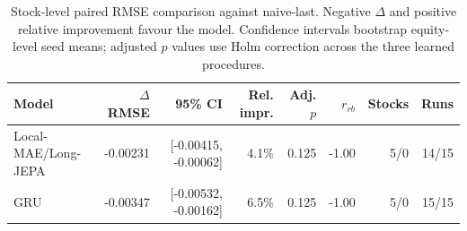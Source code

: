 \begin{table}[t]
\centering
\small
\caption{Stock-level paired RMSE comparison against naive-last. Negative $\Delta$ and positive relative improvement favour the model. Confidence intervals bootstrap equity-level seed means; adjusted $p$ values use Holm correction across the three learned procedures.}
\label{tab:paired_rmse_naive}
\begin{tabular}{lrrrrrrr}
\toprule
Model & $\Delta$RMSE & 95\% CI & Rel. impr. & Adj. $p$ & $r_{rb}$ & Stocks & Runs \\
\midrule
Local-MAE/Long-JEPA & -0.00231 & [-0.00415, -0.00062] & 4.1\% & 0.125 & -1.00 & 5/0 & 14/15 \\
GRU & -0.00347 & [-0.00532, -0.00162] & 6.5\% & 0.125 & -1.00 & 5/0 & 15/15 \\
\bottomrule
\end{tabular}
\end{table}
